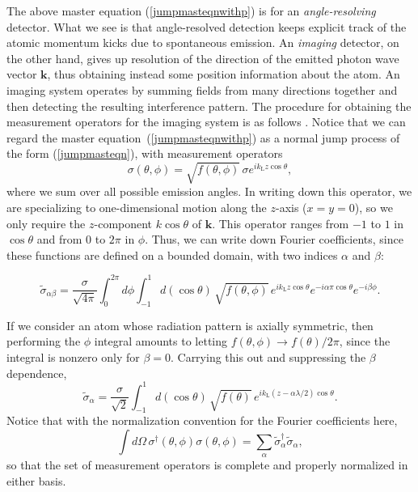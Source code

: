 \documentclass[12pt,aps,onecolum,superscriptaddress,footinbib,floatfix,showpacs]{revtex4-1}
\def\kL{k_\mathrm{\scriptscriptstyle L}}
\begin{document}
The above master equation (\ref{jumpmasteqnwithp})
is for an \textit{angle-resolving} detector.  What we see is that angle-resolved
detection keeps explicit track of the atomic momentum kicks due to 
spontaneous emission.
An \textit{imaging} detector, on the other hand, gives up resolution
of the direction of the emitted photon wave vector $\mathbf{k}$,
thus obtaining instead some position information about the atom.
An imaging system operates by summing fields from many directions together
and then detecting the resulting interference pattern.
The procedure for obtaining the measurement operators for
the imaging system is as follows \cite{Holland96, Greenwood97}.
Notice that we can regard the master equation~(\ref{jumpmasteqnwithp})
as a normal jump process of the form
(\ref{jumpmasteqn}), with measurement operators
\begin{equation}
  \sigma(\theta,\phi) = \sqrt{f(\theta,\phi)}\,\sigma e^{i\kL z\cos\theta},
\end{equation}
where we sum over all possible emission angles.  In writing down
this operator, we are specializing to one-dimensional motion along
the $z$-axis ($x=y=0$), so we only require the $z$-component 
$k\cos\theta$ of $\mathbf{k}$.
This operator ranges from $-1$ to $1$ in $\cos\theta$ and from
$0$ to $2\pi$ in $\phi$.
Thus, we can write down Fourier coefficients, since these
functions are defined on a bounded domain, with two indices
$\alpha$ and $\beta$:
\begin{widetext}
\begin{equation}
  \tilde \sigma_{\alpha\beta} = 
    \frac{\sigma}{\sqrt{4\pi}} \int_0^{2\pi} d\phi \int_{-1}^1
     d(\cos\theta)\,\sqrt{f(\theta,\phi)}\, e^{i\kL z\cos\theta} 
     e^{-i\alpha\pi\cos\theta} e^{-i\beta\phi}.
  \label{sigmaab}
\end{equation}
\end{widetext}
If we consider an atom whose radiation pattern is axially symmetric,
then performing the $\phi$ integral
amounts to letting $f(\theta,\phi)\longrightarrow f(\theta)/2\pi$,
since the integral is nonzero only for $\beta=0$.  Carrying this
out and suppressing the $\beta$ dependence,
\begin{equation}
  \tilde \sigma_{\alpha} = 
    \frac{\sigma}{\sqrt{2}}  \int_{-1}^1
     d(\cos\theta)\,\sqrt{f(\theta)}\, 
     e^{i\kL (z-\alpha\lambda/2)\cos\theta}.
  \label{sigmaab2}
\end{equation}
Notice that with the normalization convention for the Fourier coefficients
here,
\begin{equation}
  \int d\Omega\,\sigma^\dagger(\theta,\phi)\sigma(\theta,\phi)
   =\sum_\alpha \tilde\sigma^\dagger_\alpha \tilde \sigma_\alpha,
\end{equation}
so that the set of measurement operators is complete and properly normalized
in either basis.
\end{document}
